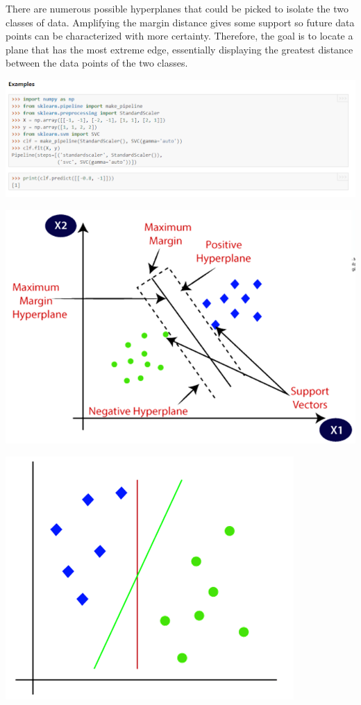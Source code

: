 \documentclass[a4paper,12pt]{report}
\begin{document}
There are numerous possible hyperplanes that could be picked to isolate the two classes of data. Amplifying the margin distance gives some support so future data points can be characterized with more certainty. Therefore, the goal is to locate a plane that has the most extreme edge, essentially displaying the greatest distance between the data points of the two classes.

\begin{center}
    \captionsetup{type=figure}
    \includegraphics[width=.7\linewidth]{media/pipeline.png}
\end{center}

\begin{center}
    \captionsetup{type=figure}
    \includegraphics[width=.5\linewidth]{media/hyperplane.png}
\end{center}

\begin{center}
    \captionsetup{type=figure}
    \includegraphics[width=.5\linewidth]{media/dotdiamond.png}
\end{center}
\end{document}
